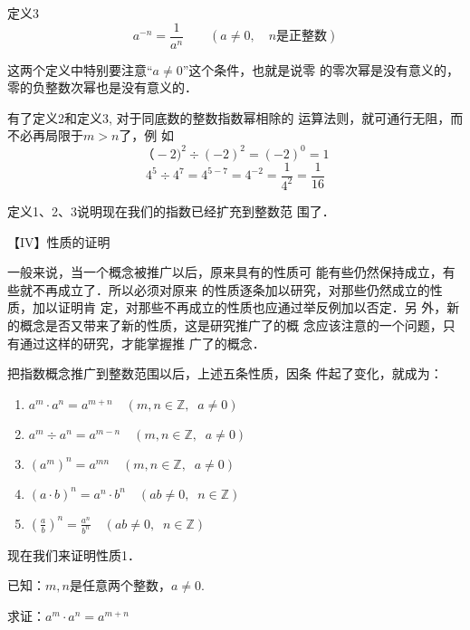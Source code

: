 \begin{blk}{定义3}
    \[a^{-n}=\frac{1}{a^n} \qquad  (a\ne 0, \quad n\text{是正整数})\]
\end{blk}

这两个定义中特别要注意“$a\ne 0$”这个条件，也就是说零
的零次幂是没有意义的，零的负整数次幂也是没有意义的．

有了定义2和定义3, 对于同底数的整数指数幂相除的
运算法则，就可通行无阻，而不必再局限于$m>n$了，例
如
\[（-2)^2\div (-2)^2=(-2)^0=1\]
\[4^5\div 4^7=4^{5-7}=4^{-2}=\frac{1}{4^2}=\frac{1}{16}\]

定义1、2、3说明现在我们的指数已经扩充到整数范
围了．

【IV】性质的证明

一般来说，当一个概念被推广以后，原来具有的性质可
能有些仍然保持成立，有些就不再成立了．所以必须对原来
的性质逐条加以研究，对那些仍然成立的性质，加以证明肯
定，对那些不再成立的性质也应通过举反例加以否定．另
外，新的概念是否又带来了新的性质，这是研究推广了的概
念应该注意的一个问题，只有通过这样的研究，才能掌握推
广了的概念．

把指数概念推广到整数范围以后，上述五条性质，因条
件起了变化，就成为：

\begin{blk}{}
\begin{enumerate}
    \item $a^m\cdot a^n=a^{m+n}\quad (m,n\in\mathbb{Z},\;\; a\ne 0)$
    \item $a^m\div a^n=a^{m-n}\quad (m,n\in\mathbb{Z},\;\; a\ne 0)$
    \item $(a^m)^n=a^{mn}\quad (m,n\in\mathbb{Z},\;\; a\ne 0)$
    \item $(a\cdot b)^n=a^{n}\cdot b^n\quad (ab\ne 0,\;\; n\in\mathbb{Z})$
    \item $\left(\frac{a}{b}\right)^n=\frac{a^n}{b^n}\quad (ab\ne 0,\;\; n\in\mathbb{Z})$
\end{enumerate}    
\end{blk}

现在我们来证明性质1．

已知：$m,n$是任意两个整数，$a\ne 0$.

求证：$a^m\cdot a^n=a^{m+n}$

